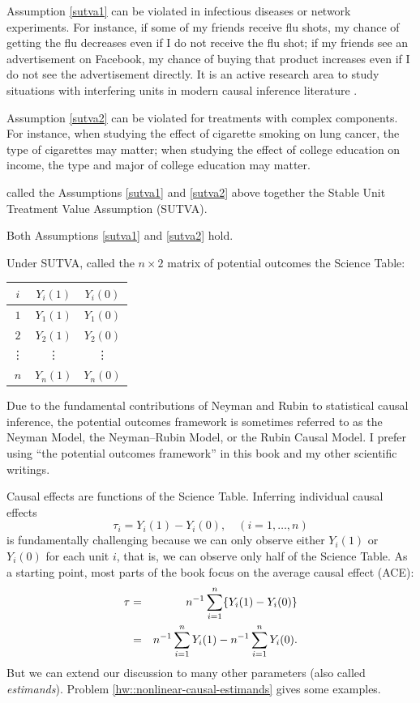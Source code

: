 Assumption \ref{sutva1} can be violated in infectious diseases or network experiments. For instance, if some of my friends receive flu shots, my chance of getting the flu decreases even if I do not receive the flu shot; if my friends see an advertisement on Facebook, my chance of buying that product increases even if I do not see the advertisement directly. It is an active research area to study situations with interfering units in modern causal inference literature \citep[e.g.,][]{hudgens2008toward}. 


Assumption \ref{sutva2} can be violated for treatments with complex components. For instance, when studying the effect of cigarette smoking on lung cancer, the type of cigarettes may matter; when studying the effect of college education on income, the type and major of college education may matter. 


\citet{Rubin:1980} called the Assumptions \ref{sutva1} and \ref{sutva2} above together the Stable Unit Treatment Value Assumption (SUTVA).


\begin{assumption}
[SUTVA]
\label{sutva-complete}
Both Assumptions \ref{sutva1} and \ref{sutva2} hold.
\end{assumption}


Under SUTVA, \citet{Rubin:2005} called the $n\times 2$ matrix of potential outcomes the Science Table:
\begin{center}
\begin{tabular}{ccc}
\hline 
$i$ & $Y_i(1)$ &  $Y_i(0)$ \\
 \hline 
$1$ & $Y_1(1)$ &  $Y_1(0)$ \\
$2$ & $Y_2(1)$ &  $Y_2(0)$ \\
\vdots  &\vdots & \vdots   \\
$n$ & $Y_n(1)$ &  $Y_n(0)$ \\
\hline 
\end{tabular}
\end{center}  


Due to the fundamental contributions of Neyman and Rubin to statistical causal inference, the potential outcomes framework is sometimes referred to as the Neyman Model, the Neyman--Rubin Model, or the Rubin Causal Model. I prefer using  ``the potential outcomes framework'' in this book and my other scientific writings. 
 
 
Causal effects are functions of the Science Table. Inferring individual causal effects 
$$
\tau_i =  Y_i(1) - Y_i(0) ,\quad (i=1, \ldots, n)
$$ 
is fundamentally challenging because we can only observe either $Y_i(1)$ or $Y_i(0)$ for each unit $i$, that is, we can observe only half of the Science Table. As a starting point, most parts of the book focus on the average causal effect (ACE): 
\begin{eqnarray*}
\tau  &=&  n^{-1} \sum_{i=1}^n \{  Y_i(1) - Y_i(0) \}  \\
&=&  n^{-1} \sum_{i=1}^n  Y_i(1) -  n^{-1} \sum_{i=1}^n  Y_i(0).
\end{eqnarray*} 
But we can extend our discussion to many other parameters (also called {\it estimands}).  Problem \ref{hw::nonlinear-causal-estimands} gives some examples. 


